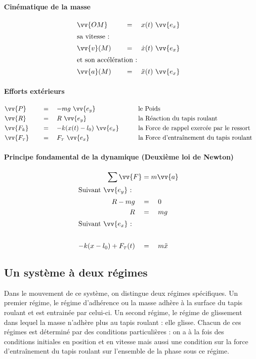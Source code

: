 \documentclass{article}
\newcommand{\ts}{\scriptscriptstyle}
\begin{document}
\paragraph{Cinématique de la masse}\label{par_1.0.0.2}
\begin{alignat*}{3}
& \vv{OM} \quad && = \quad  x(t)~\vv{e_x}\\
\intertext{sa vitesse :}
& \vv{v}(M) \quad && = \quad  \dot{x}(t)~\vv{e_x}\\
\intertext{et son accélération :}
& \vv{a}(M) \quad && = \quad  \ddot{x}(t)~\vv{e_x}
\end{alignat*}

\paragraph{Efforts extérieurs}\label{par_1.0.0.3}
%
\begin{adjustwidth}{0cm}{3.5cm}
\vspace{-.7cm}
\begin{alignat*}{3}
& \vv{P} \quad && = \quad  -mg~\vv{e_y} &&\qquad \text{le Poids}\\
& \vv{R} \quad && = \quad  R~\vv{e_y} &&\qquad \text{la Réaction du tapis roulant}\\
& \vv{F_k} \quad && = \quad  -k(x(t)-l_0)~\vv{e_x} &&\qquad \text{la Force de rappel exercée par le ressort}\\
& \vv{F_{\ts{T}}} \quad && = \quad  F_{\ts{T}}~\vv{e_x} &&\qquad \text{la Force d'entraînement du tapis roulant}
\end{alignat*}
\end{adjustwidth}
%
\paragraph{Principe fondamental de la dynamique (Deuxième loi de Newton)}\label{par_1.0.0.4}
%
\begin{alignat}{2}
\sum{\vv{F}} &=  m\vv{a}\nonumber\\
\intertext{Suivant $\vv{e_y}$ :} \nonumber
 R- mg \quad & =  \quad 0 \nonumber\\
 R  \quad & = \quad  mg \nonumber\\
\intertext{Suivant $\vv{e_x}$ :} \nonumber \\
-k(x-l_0)+F_{\ts{T}}(t)\quad & = \quad m\ddot{x} \label{eq_1}
\end{alignat}
%
\subsection{Un système à deux régimes}\label{ssec_1.1}
Dans le mouvement de ce système, on distingue deux régimes spécifiques. Un premier régime, le régime d'adhérence ou la masse adhère à la surface du tapis roulant et est entrainée par celui-ci. Un second régime, le régime de glissement dans lequel la masse n'adhère plus au tapis roulant : elle glisse. Chacun de ces régimes est déterminé par des conditions particulières : on a à la fois des conditions initiales en position et en vitesse mais aussi une condition sur la force d'entraînement du tapis roulant sur l'ensemble de la phase sous ce régime. 
\end{document}
